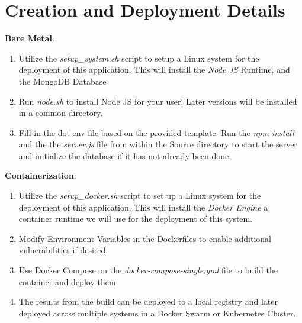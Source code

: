 
\section{Creation and Deployment Details}

\noindent\textbf{Bare Metal}:
\begin{enumerate}
    \item Utilize the \textit{setup\_system.sh} script to setup a Linux system for the deployment of this application. This will install the \textit{Node JS} Runtime, and the MongoDB Database
    \item Run \textit{node.sh} to install Node JS for your user! Later versions will be installed in a common directory.
    \item Fill in the dot env file based on the provided template. Run the \textit{npm install} and the the \textit{server.js} file from within the Source directory to start the server and initialize the database if it has not already been done. 
\end{enumerate}


\noindent\textbf{Containerization}:
\begin{enumerate}
    \item Utilize the \textit{setup\_docker.sh} script to set up a Linux system for the deployment of this application. This will install the \textit{Docker Engine} a container runtime we will use for the deployment of this system.
    \item Modify Environment Variables in the Dockerfiles to enable additional vulnerabilities if desired.
    \item Use Docker Compose on the \textit{docker-compose-single.yml} file to build the container and deploy them.
    \item The results from the build can be deployed to a local registry and later deployed across multiple systems in a Docker Swarm or Kubernetes Cluster.
\end{enumerate}